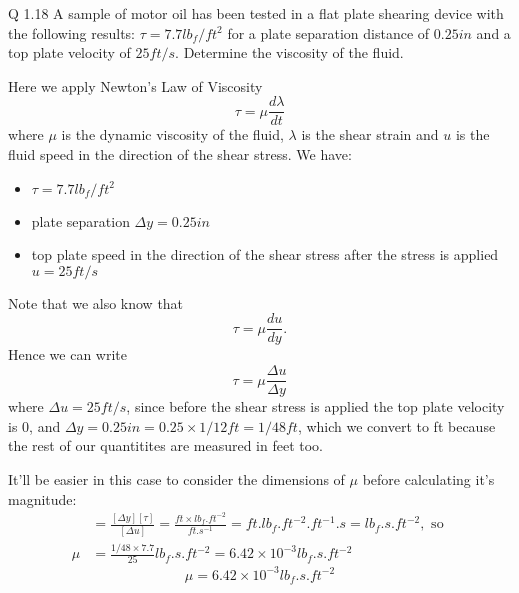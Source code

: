 \begin{question}
  Q 1.18 A sample of motor oil has been tested in a flat plate shearing device with the following results: $\tau = 7.7 \si{lb_{f}/ft^2}$ for a plate separation distance of $0.25 \si{in}$ and a top plate velocity of $25 \si{ft/s}$. Determine the viscosity of the fluid.
\end{question}

\begin{solution}
  Here we apply Newton's Law of Viscosity
  \begin{equation}\label{eq:newton-viscosity}
    \tau = \mu \frac{ d \lambda }{ dt }
  \end{equation}
  where $\mu$ is the dynamic viscosity of the fluid, $\lambda$ is the shear strain and $u$ is the fluid speed in the direction of the shear stress. We have:

  \begin{itemize}
    \item $\tau = 7.7 \si{lb_{f}/ft^2}$
    \item plate separation $\Delta y = 0.25 \si{in}$
    \item top plate speed in the direction of the shear stress after the stress is applied $u = 25 \si{ft/s}$
  \end{itemize}

  Note that we also know that
  \begin{equation}
    \tau = \mu \frac{ du }{ dy }.
  \end{equation}
  Hence we can write
  \begin{equation}
    \tau = \mu \frac{ \Delta u }{\Delta y}
  \end{equation}
  where $\Delta u = 25 \si{ft/s}$, since before the shear stress is applied the top plate velocity is $0$, and $\Delta y = 0.25 \si{in} = 0.25 \times 1/12 \si{ft} = 1/48 \si{ft}$, which we convert to \si{ft} because the rest of our quantitites are measured in feet too.

  It'll be easier in this case to consider the dimensions of $\mu$ before calculating it's magnitude:
  \begin{align*}
    [\mu] &= \frac{[\Delta y][\tau]}{[\Delta u]} = \frac{ \si{ft} \times \si{lb_f.ft^{-2}} }{ \si{ ft.s^{-1}} }
      = \si{ft.lb_f.ft^{-2}.ft^{-1}.s} = \si{lb_f.s.ft^{-2}}, \text{ so } \\
    \mu &= \frac{ 1/48 \times 7.7 }{25} \si{lb_f.s.ft^{-2}} = 6.42 \times 10^{-3} \si{lb_f.s.ft^{-2}}
  \end{align*}
  \begin{equation*}
    \boxed{\mu = 6.42 \times 10^{-3} \si{lb_f.s.ft^{-2}}}
  \end{equation*}
\end{solution}

